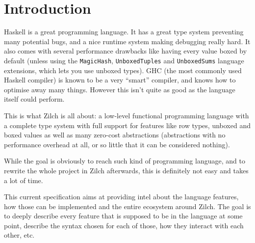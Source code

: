 \part{Introduction}\label{part:intro}

Haskell is a great programming language. It has a great type system preventing many potential bugs, and a nice runtime system making debugging really hard. It also comes with several performance drawbacks like having every value boxed by default (unless using the \texttt{MagicHash}, \texttt{UnboxedTuples} and \texttt{UnboxedSums} language extensions, which lets you use unboxed types). GHC (the most commonly used Haskell compiler) is known to be a very ``smart'' compiler, and knows how to optimise away many things. However this isn't quite as good as the language itself could perform.

This is what Zilch is all about: a low-level functional programming language with a complete type system with full support for features like row types, unboxed and boxed values as well as many zero-cost abstractions (abstractions with no performance overhead at all, or so little that it can be considered nothing).

While the goal is obviously to reach such kind of programming language, and to rewrite the whole project in Zilch afterwards, this is definitely not easy and takes a lot of time.

\vspace{\baselineskip}

This current specification aims at providing intel about the language features, how those can be implemented and the entire ecosystem around Zilch.
The goal is to deeply describe every feature that is supposed to be in the language at some point, describe the syntax chosen for each of those, how they interact with each other, etc.
